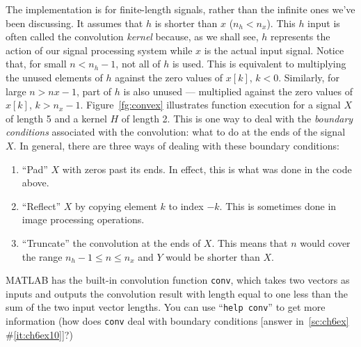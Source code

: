The implementation is for finite-length signals, rather than the
infinite ones we've been discussing. It assumes that $h$ is shorter
than $x$ ($n_h < n_x$). This $h$ input is often called the convolution
\emph{kernel} because, as we shall see, $h$ represents the
action of our signal processing system while $x$ is the actual input
signal.  Notice that, for small $n<n_h-1$, not all of $h$ is
used. This is equivalent to multiplying the unused elements of $h$
against the zero values of $x[k]$, $k<0$. Similarly, for large
$n>nx-1$, part of $h$ is also unused --- multiplied against the zero
values of $x[k]$, $k>n_x-1$. Figure~\ref{fg:convex} illustrates
function execution for a signal $X$ of length 5 and a kernel $H$ of
length 2. This is one way to deal with the \emph{boundary conditions}
associated with the convolution: what to do at the ends of the
signal $X$.  In general, there are three ways of dealing with these
boundary conditions:
\begin{enumerate}
\item ``Pad'' $X$ with zeros past its ends. In effect, this is what
was done in the code above.
\item ``Reflect'' $X$ by copying element $k$ to index $-k$. This is
sometimes done in image processing operations.
\item ``Truncate'' the convolution at the ends of $X$. This means that
$n$ would cover the range $n_h-1 \leq n \leq n_x$ and $Y$ would be
shorter than $X$.
\end{enumerate}

MATLAB has the built-in convolution function \verb|conv|, which takes
two vectors as inputs and outputs the convolution result with length
equal to one less than the sum of the two input vector lengths. You
can use ``\verb|help conv|'' to get more information (how does
\verb|conv| deal with boundary conditions [answer in~\ref{sc:ch6ex}
\#\ref{it:ch6ex10}]?)

